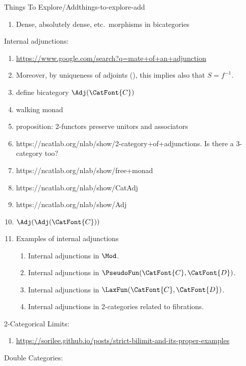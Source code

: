 \begin{remark}{Things To Explore/Add}{things-to-explore-add}
\begin{enumerate}
        \item Dense, absolutely dense, etc.\ morphisms in bicategories
    \end{enumerate}
    Internal adjunctions:
    \begin{enumerate}
        \item \url{https://www.google.com/search?q=mate+of+an+adjunction}
        \item Moreover, by uniqueness of adjoints (), this implies also that $S=f^{-1}$.
        \item define bicategory $\Adj(\CatFont{C})$
        \item walking monad
        \item proposition: 2-functors preserve unitors and associators
        \item https://ncatlab.org/nlab/show/2-category+of+adjunctions. Is there a 3-category too?
        \item https://ncatlab.org/nlab/show/free+monad
        \item https://ncatlab.org/nlab/show/CatAdj
        \item https://ncatlab.org/nlab/show/Adj
        \item $\Adj(\Adj(\CatFont{C}))$
        \item Examples of internal adjunctions
            \begin{enumerate}
                \item Internal adjunctions in $\Mod$.
                \item Internal adjunctions in $\PseudoFun(\CatFont{C},\CatFont{D})$.
                \item Internal adjunctions in $\LaxFun(\CatFont{C},\CatFont{D})$.
                \item Internal adjunctions in 2-categories related to fibrations.
            \end{enumerate}
    \end{enumerate}
    2-Categorical Limits:
    \begin{enumerate}
        \item \url{https://sorilee.github.io/posts/strict-bilimit-and-its-proper-examples}
    \end{enumerate}
    Double Categories:

\end{remark}
